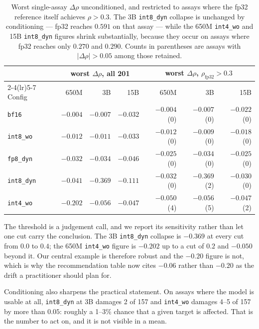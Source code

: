 \documentclass[11pt]{article}
\newcommand{\cfg}[1]{\texttt{#1}}
\begin{document}
\begin{table}[htb]
\centering
\caption{Worst single-assay $\Delta\rho$ unconditioned, and restricted to assays
where the fp32 reference itself achieves $\rho > 0.3$. The 3B \cfg{int8\_dyn}
collapse is unchanged by conditioning --- fp32 reaches $0.591$ on that assay ---
while the 650M \cfg{int4\_wo} and 15B \cfg{int8\_dyn} figures shrink
substantially, because they occur on assays where fp32 reaches only $0.270$ and
$0.290$. Counts in parentheses are assays with $|\Delta\rho| > 0.05$ among those
retained.}
\label{tab:tailcond}
\small
\begin{tabular}{lrrrrrr}
\toprule
& \multicolumn{3}{c}{worst $\Delta\rho$, all 201} & \multicolumn{3}{c}{worst $\Delta\rho$, $\rho_{\text{fp32}}>0.3$} \\
\cmidrule(lr){2-4}\cmidrule(lr){5-7}
Config & 650M & 3B & 15B & 650M & 3B & 15B \\
\midrule
\cfg{bf16}      & $-0.004$ & $-0.007$ & $-0.032$ & $-0.004$ (0) & $-0.007$ (0) & $-0.022$ (0) \\
\cfg{int8\_wo}  & $-0.012$ & $-0.011$ & $-0.033$ & $-0.012$ (0) & $-0.009$ (0) & $-0.018$ (0) \\
\cfg{fp8\_dyn}  & $-0.032$ & $-0.034$ & $-0.046$ & $-0.025$ (0) & $-0.034$ (0) & $-0.025$ (0) \\
\cfg{int8\_dyn} & $-0.041$ & $\mathbf{-0.369}$ & $-0.111$ & $-0.032$ (0) & $\mathbf{-0.369}$ (2) & $-0.030$ (0) \\
\cfg{int4\_wo}  & $-0.202$ & $-0.056$ & $-0.047$ & $-0.050$ (4) & $-0.056$ (5) & $-0.047$ (2) \\
\bottomrule
\end{tabular}
\end{table}

The threshold is a judgement call, and we report its sensitivity rather than let
one cut carry the conclusion. The 3B \cfg{int8\_dyn} collapse is $-0.369$ at
every cut from $0.0$ to $0.4$; the 650M \cfg{int4\_wo} figure is $-0.202$ up to
a cut of $0.2$ and $-0.050$ beyond it. Our central example is therefore robust
and the $-0.20$ figure is not, which is why the recommendation table now cites
$-0.06$ rather than $-0.20$ as the drift a practitioner should plan for.

Conditioning also sharpens the practical statement. On assays where the model is
usable at all, \cfg{int8\_dyn} at 3B damages 2 of 157 and \cfg{int4\_wo} damages
4--5 of 157 by more than $0.05$: roughly a 1--3\% chance that a given target is
affected. That is the number to act on, and it is not visible in a mean.
\end{document}
